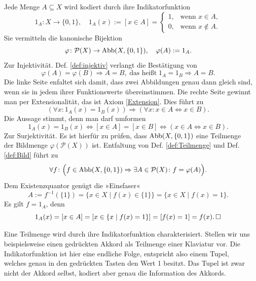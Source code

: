 \begin{Beweis}
Jede Menge $A\subseteq X$ wird kodiert durch ihre
Indikatorfunktion
\[1_A\colon X\to\{0,1\},\quad 1_A(x) := [x\in A] =
\begin{cases}
1, & \text{wenn $x\in A$},\\
0, & \text{wenn $x\notin A$}.
\end{cases}\]
Sie vermitteln die kanonische Bijektion
\[\varphi\colon\mathcal P(X)\to\operatorname{Abb}(X,\{0,1\}),\quad \varphi(A):=1_A.\]
Zur Injektivität. Def. \ref{def:injektiv} verlangt die Bestätigung von%
\[\varphi(A)=\varphi(B)\Rightarrow A=B,\;\text{das heißt}\;
1_A=1_B \Rightarrow A=B.\]
Die linke Seite enfaltet sich damit, dass zwei Abbildungen genau dann
gleich sind, wenn sie in jedem ihrer Funktionswerte
übereinstimmen. Die rechte Seite gewinnt man per Extensionalität,
das ist Axiom \ref{Extension}. Dies führt zu
\[(\forall x\colon 1_A(x)=1_B(x))\Rightarrow
(\forall x\colon x\in A\Leftrightarrow x\in B).\]
Die Aussage stimmt, denn man darf umformen
\[1_A(x)=1_B(x)\iff [x\in A]=[x\in B] \iff (x\in A\Leftrightarrow x\in B).\]
Zur Surjektivität. Es ist hierfür zu prüfen, dass $\operatorname{Abb}(X,\{0,1\})$ eine
Teilmenge der Bildmenge $\varphi(\mathcal P(X))$ ist.
Entfaltung von Def. \ref{def:Teilmenge} und Def. \ref{def:Bild} führt zu%
\[\forall f\colon \Big(f\in\operatorname{Abb}(X,\{0,1\})\Rightarrow\exists A\in\mathcal P(X)\colon f=\varphi(A)\Big).\]
Dem Existenzquantor genügt die »Einsfaser«
\[A := f^{-1}(\{1\}) = \{x\in X\mid f(x)\in \{1\}\} = \{x\in X\mid f(x)=1\}.\]
Es gilt $f=1_A$, denn
\[1_A(x) = [x\in A] = [x\in\{x\mid f(x)=1\}] = [f(x)=1] = f(x).\,\Box\]
\end{Beweis}

\noindent
Eine Teilmenge wird durch ihre Indikatorfunktion charakterisiert.
Stellen wir uns beispielsweise einen gedrückten Akkord als Teilmenge
einer Klaviatur vor. Die Indikatorfunktion ist hier eine endliche
Folge, entspricht also einem Tupel, welches genau in den gedrückten
Tasten den Wert 1 besitzt. Das Tupel ist zwar nicht der Akkord selbst,
kodiert aber genau die Information des Akkords.

